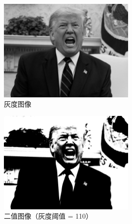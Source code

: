 \documentclass[11pt]{ctexart}
\begin{document}
    \begin{figure}[htbp]
        \centering
        \includegraphics[width=0.6\textwidth]{./Trump_grey.jpg}
        \caption{灰度图像}\label{fig:digit}
  \end{figure}
  
  
    \begin{figure}[htbp]
        \centering
        \includegraphics[width=0.6\textwidth]{./Trump_binary_110.jpg}
        \caption{二值图像（灰度阈值 = 110）}\label{fig:digit}
  \end{figure}
\end{document}
